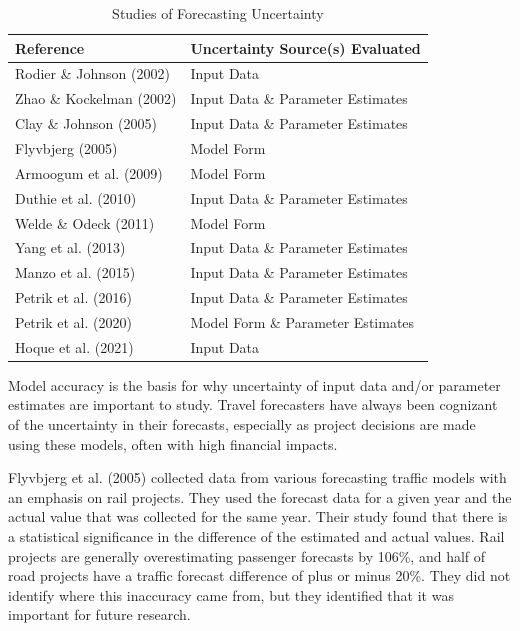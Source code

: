 \documentclass[
  futuretransp,
  submit,
  moreauthors,
]{Definitions/mdpi}
\begin{document}
\begin{longtable}[t]{ll}

\caption{\label{tbl-authors}Studies of Forecasting Uncertainty}

\tabularnewline

\toprule
Reference & Uncertainty Source(s) Evaluated\\
\midrule
Rodier \& Johnson (2002) & Input Data\\
Zhao \& Kockelman (2002) & Input Data \& Parameter Estimates\\
Clay \& Johnson (2005) & Input Data \& Parameter Estimates\\
Flyvbjerg (2005) & Model Form\\
Armoogum et al. (2009) & Model Form\\
\addlinespace
Duthie et al. (2010) & Input Data \& Parameter Estimates\\
Welde \& Odeck (2011) & Model Form\\
Yang et al. (2013) & Input Data \& Parameter Estimates\\
Manzo et al. (2015) & Input Data \& Parameter Estimates\\
Petrik et al. (2016) & Input Data \& Parameter Estimates\\
\addlinespace
Petrik et al. (2020) & Model Form \& Parameter Estimates\\
Hoque et al. (2021) & Input Data\\
\bottomrule

\end{longtable}

Model accuracy is the basis for why uncertainty of input data and/or
parameter estimates are important to study. Travel forecasters have
always been cognizant of the uncertainty in their forecasts, especially
as project decisions are made using these models, often with high
financial impacts.

Flyvbjerg et al. (2005) collected data from various forecasting traffic
models with an emphasis on rail projects. They used the forecast data
for a given year and the actual value that was collected for the same
year. Their study found that there is a statistical significance in the
difference of the estimated and actual values. Rail projects are
generally overestimating passenger forecasts by 106\%, and half of road
projects have a traffic forecast difference of plus or minus 20\%. They
did not identify where this inaccuracy came from, but they identified
that it was important for future research.
\end{document}
